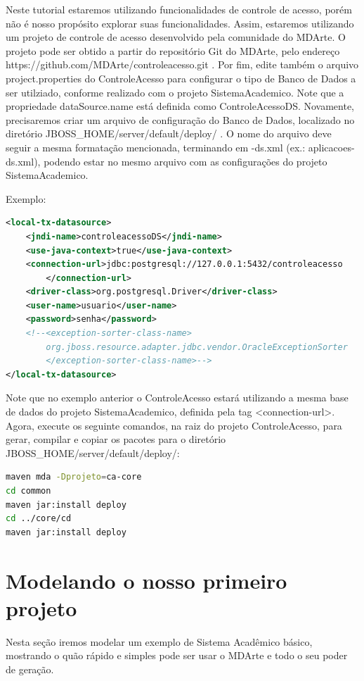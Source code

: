 Neste tutorial estaremos utilizando funcionalidades de controle de acesso, porém não é
nosso propósito explorar suas funcionalidades. Assim, estaremos utilizando um projeto de controle
de acesso desenvolvido pela comunidade do MDArte.
O projeto pode ser obtido a partir do repositório Git do MDArte,
pelo endereço https://github.com/MDArte/controleacesso.git . Por fim, edite também o
arquivo project.properties do ControleAcesso para configurar o tipo de Banco de Dados a ser
utilziado, conforme realizado com o projeto SistemaAcademico. Note que a propriedade
dataSource.name está definida como ControleAcessoDS.
Novamente, precisaremos criar um arquivo de configuração do Banco de Dados, localizado
no diretório JBOSS\_HOME/server/default/deploy/ . O nome do arquivo deve seguir
a mesma formatação mencionada, terminando em -ds.xml (ex.: aplicacoes-ds.xml), podendo estar no mesmo
arquivo com as configurações do projeto SistemaAcademico.

Exemplo:

\begin{lstlisting}[language=xml]
<local-tx-datasource>
	<jndi-name>controleacessoDS</jndi-name>
	<use-java-context>true</use-java-context>
	<connection-url>jdbc:postgresql://127.0.0.1:5432/controleacesso
		</connection-url> 
	<driver-class>org.postgresql.Driver</driver-class>
	<user-name>usuario</user-name>
	<password>senha</password>
	<!--<exception-sorter-class-name>
		org.jboss.resource.adapter.jdbc.vendor.OracleExceptionSorter
		</exception-sorter-class-name>-->
</local-tx-datasource>
\end{lstlisting}

Note que no exemplo anterior o ControleAcesso estará utilizando a mesma base de dados
do projeto SistemaAcademico, definida pela tag <connection-url>. Agora, execute os seguinte
comandos, na raiz do projeto ControleAcesso, para gerar, compilar e copiar os pacotes para o
diretório JBOSS\_HOME/server/default/deploy/:

\begin{lstlisting}[language=bash]
maven mda -Dprojeto=ca-core
cd common
maven jar:install deploy
cd ../core/cd
maven jar:install deploy
\end{lstlisting}

\section{Modelando o nosso primeiro projeto}

Nesta seção iremos modelar um exemplo de Sistema Acadêmico básico, mostrando o
quão rápido e simples pode ser usar o MDArte e todo o seu poder de geração.

